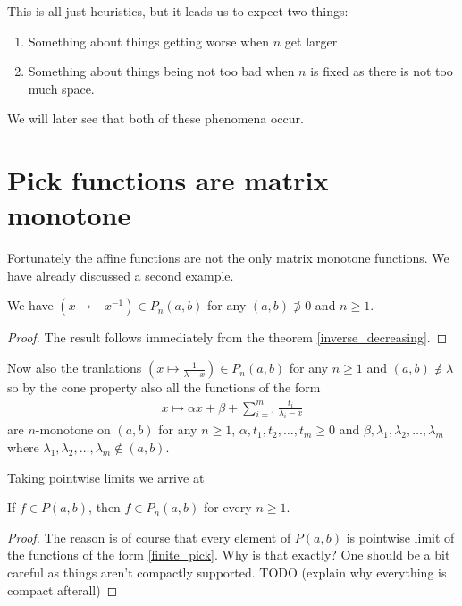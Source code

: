 This is all just heuristics, but it leads us to expect two things:

\begin{enumerate}
	\item Something about things getting worse when $n$ get larger
	\item Something about things being not too bad when $n$ is fixed as there is not too much space.
\end{enumerate}

We will later see that both of these phenomena occur.

\section{Pick functions are matrix monotone}

Fortunately the affine functions are not the only matrix monotone functions. We have already discussed a second example.

\begin{prop}
	We have $(x \mapsto -x^{-1}) \in P_{n}(a, b)$ for any $(a, b) \not\ni 0$ and $n \geq 1$.
\end{prop}
\begin{proof}
	The result follows immediately from the theorem \ref{inverse_decreasing}.
\end{proof}

Now also the tranlations $(x \mapsto \frac{1}{\lambda - x}) \in P_{n}(a, b)$ for any $n \geq 1$ and $(a, b) \not\ni \lambda$ so by the cone property also all the functions of the form
\begin{align}\label{finite_pick}
	x \mapsto \alpha x + \beta + \sum_{i = 1}^{m} \frac{t_{i}}{\lambda_{i} - x}
\end{align}
are $n$-monotone on $(a, b)$ for any $n \geq 1$, $\alpha, t_{1}, t_{2}, \ldots, t_{m} \geq 0$ and $\beta, \lambda_{1}, \lambda_{2}, \ldots, \lambda_{m}$ where $\lambda_{1}, \lambda_{2}, \ldots, \lambda_{m} \not\in (a, b)$.

Taking pointwise limits we arrive at

\begin{lause}
	If $f \in P(a, b)$, then $f \in P_{n}(a, b)$ for every $n \geq 1$.
\end{lause}
\begin{proof}
	The reason is of course that every element of $P(a, b)$ is pointwise limit of the functions of the form \ref{finite_pick}. Why is that exactly? One should be a bit careful as things aren't compactly supported. TODO (explain why everything is compact afterall)
\end{proof}

